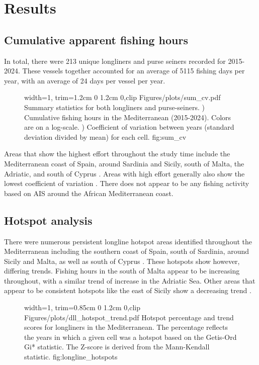 \chapter{Results}
\section{Cumulative apparent fishing hours}

In total, there were 213 unique longliners and purse seiners recorded for 2015-2024. These vessels together accounted
for an average of 5115 fishing days per year, with an average of 24 days per vessel per year. 

\medskip

\begin{figure}[h]
    {width=1\linewidth, trim=1.2cm 0 1.2cm 0,clip}
    {Figures/plots/sum_cv.pdf}
    {%
    Summary statistics for both longliners and purse-seiners. ) Cumulative fishing hours in the Mediterranean (2015-2024). 
    Colors are on a log-scale. ) Coefficient of variation between years (standard deviation divided by mean) for each cell.
    }{fig:sum_cv}
\end{figure}

Areas that show  the highest effort throughout
the study time include the Mediterranean coast of Spain, around Sardinia and Sicily, south of Malta, the Adriatic, and
south of Cyprus . Areas with high effort generally also show the lowest coefficient of variation .
There does not appear to be any fishing activity based on AIS around the African Mediterranean coast.

\FloatBarrier
\section{Hotspot analysis}
There were numerous persistent longline hotspot areas identified throughout the Mediterranean including the southern coast of Spain, south of Sardinia, 
around Sicily and Malta, as well as south of Cyprus . These hotspots show however, differing trends. Fishing hours
in the south of Malta appear to be increasing throughout, with a similar trend of increase in the Adriatic Sea. Other areas that appear to be consistent
hotspots like the east of Sicily show a decreasing trend .

\begin{figure}[h]
    {width=1\linewidth, trim=0.85cm 0 1.2cm 0,clip}
    {Figures/plots/dll_hotspot_trend.pdf}
    {%
    Hotspot percentage and trend scores for longliners in the Mediterranean.
    The percentage reflects the years in which a given cell was a hotspot based on the Getis-Ord Gi* statistic.
    The Z-score is derived from the Mann-Kendall statistic.}
    {fig:longline_hotspots}
\end{figure}

